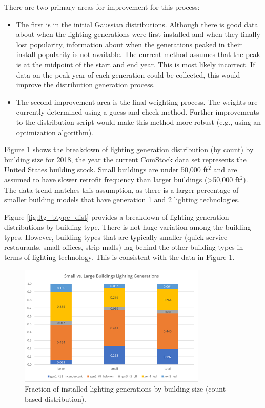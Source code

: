 There are two primary areas for improvement for this process:
\begin{itemize}
\item The first is in the initial Gaussian distributions. Although there is good data about when the lighting generations were first installed and when they finally lost popularity, information about when the generations peaked in their install popularity is not available. The current method assumes that the peak is at the midpoint of the start and end year. This is most likely incorrect. If data on the peak year of each generation could be collected, this would improve the distribution generation process.
\item The second improvement area is the final weighting process. The weights are currently determined using a guess-and-check method.  Further improvements to the distribution script would make this method more robust (e.g., using an optimization algorithm).
\end{itemize}

Figure \ref{fig:ltg_size_dist} shows the breakdown of lighting generation distribution (by count) by building size for 2018, the year the current ComStock data set represents the United States building stock. Small buildings are under 50,000 ft$^2$ and are assumed to have slower retrofit frequency than larger buildings (>50,000 ft$^2$). The data trend matches this assumption, as there is a larger percentage of smaller building models that have generation 1 and 2 lighting technologies.

Figure \ref{fig:ltg_btype_dist} provides a breakdown of lighting generation distributions by building type. There is not huge variation among the building types. However, building types that are typically smaller (quick service restaurants, small offices, strip malls) lag behind the other building types in terms of lighting technology.  This is consistent with the data in Figure \ref{fig:ltg_size_dist}.

\begin{figure}[ht!]
    \centering \includegraphics[width=0.8\textwidth]{figures/ltg_size_dist.png}
    \caption[Fraction of installed lighting generations by building size] {Fraction of installed lighting generations by building size (count-based distribution).}
    \label{fig:ltg_size_dist}
\end{figure}

